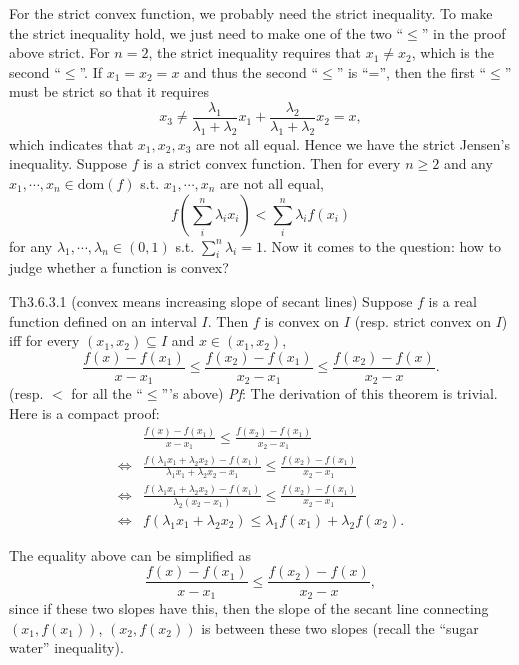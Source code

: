 \documentclass{article}
\begin{document}
\begin{Rmk}{}
    For the strict convex function, we probably need the strict inequality. To make the strict inequality hold, we just need to make one of the two ``$\leq$'' in the proof above strict. For $n=2$, the strict inequality requires that $x_1\neq x_2$, which is the second ``$\leq$''. If $x_1=x_2=x$ and thus the second ``$\leq$'' is ``='', then the first ``$\leq$'' must be strict so that it requires
    $$ x_3\neq \frac{\lambda_1}{\lambda_1+\lambda_2}x_1 + \frac{\lambda_2}{\lambda_1+\lambda_2}x_2 = x,$$
    which indicates that $x_1, x_2, x_3$ are not all equal. Hence we have the strict Jensen's inequality. \textcolor{Th}{Suppose $f$ is a strict convex function. Then for every $n\geq2$ and any $x_1, \cdots, x_n\in\text{dom}(f)$ s.t. $x_1, \cdots, x_n$ are not all equal,
    $$ f\left(\sum_{i}^{n}\lambda_i x_i\right) < \sum_{i}^{n}\lambda_i f(x_i) $$
    for any $\lambda_1, \cdots, \lambda_n\in (0,1)$ s.t. $\sum_{i}^{n}\lambda_i = 1$.}
    Now it comes to the question: how to judge whether a function is convex?
\end{Rmk}

\begin{Th}{Th3.6.3.1 (convex means increasing slope of secant lines)}
    Suppose $f$ is a real function defined on an interval $I$. Then $f$ is convex on $I$ (resp. strict convex on $I$) iff for every $(x_1, x_2)\subseteq I$ and $x\in (x_1, x_2)$, 
    $$ \frac{f(x)-f(x_1)}{x-x_1} \leq \frac{f(x_2)-f(x_1)}{x_2-x_1} \leq \frac{f(x_2)-f(x)}{x_2-x}. $$
    (resp. $<$ for all the ``$\leq$'''s above)
    \tcblower
    \textit{Pf}: The derivation of this theorem is trivial. Here is a compact proof:
    $$
    \begin{aligned}
        &\frac{f(x)-f(x_1)}{x-x_1} \leq \frac{f(x_2)-f(x_1)}{x_2-x_1} \\
        \Leftrightarrow &\frac{f(\lambda_1 x_1 + \lambda_2 x_2) - f(x_1)}{\lambda_1 x_1 + \lambda_2 x_2-x_1} \leq \frac{f(x_2)-f(x_1)}{x_2-x_1} \\
        \Leftrightarrow &\frac{f(\lambda_1 x_1 + \lambda_2 x_2) - f(x_1)}{\lambda_2 (x_2-x_1)} \leq \frac{f(x_2)-f(x_1)}{x_2-x_1} \\
        \Leftrightarrow &f(\lambda_1 x_1 + \lambda_2 x_2) \leq \lambda_1 f(x_1) + \lambda_2 f(x_2).
    \end{aligned}
    $$
\end{Th}

\begin{Rmk}{}
    The equality above can be simplified as 
    $$ \frac{f(x)-f(x_1)}{x-x_1} \leq \frac{f(x_2)-f(x)}{x_2-x}, $$
    since if these two slopes have this, then the slope of the secant line connecting $(x_1, f(x_1))$, $(x_2, f(x_2))$ is between these two slopes (recall the ``sugar water'' inequality). 
\end{Rmk}
\end{document}
